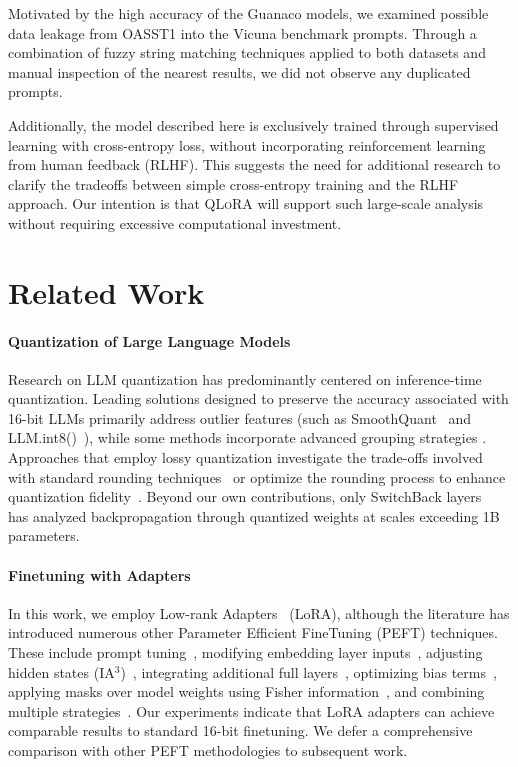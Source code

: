 Motivated by the high accuracy of the {Guanaco} models, we examined possible data leakage from OASST1 into the Vicuna benchmark prompts. Through a combination of fuzzy string matching techniques applied to both datasets and manual inspection of the nearest results, we did not observe any duplicated prompts.

Additionally, the model described here is exclusively trained through supervised learning with cross-entropy loss, without incorporating reinforcement learning from human feedback (RLHF). This suggests the need for additional research to clarify the tradeoffs between simple cross-entropy training and the RLHF approach. Our intention is that \textsc{QLoRA} will support such large-scale analysis without requiring excessive computational investment.

\section{Related Work}

\paragraph{Quantization of Large Language Models} Research on LLM quantization has predominantly centered on inference-time quantization. Leading solutions designed to preserve the accuracy associated with 16-bit LLMs primarily address outlier features (such as SmoothQuant~\citep{xiao2022smoothquant} and LLM.int8()~\citep{dettmers2022llm}), while some methods incorporate advanced grouping strategies \citep{park2022nuqmm, yao2022zeroquant}. Approaches that employ lossy quantization investigate the trade-offs involved with standard rounding techniques~\citep{dettmers2022case,zeng2022glm,pope2022efficiently} or optimize the rounding process to enhance quantization fidelity~\citep{frantar2022gptq}. Beyond our own contributions, only SwitchBack layers~\citep{wortsman2023stable} has analyzed backpropagation through quantized weights at scales exceeding 1B parameters.

\paragraph{Finetuning with Adapters} In this work, we employ Low-rank Adapters~\citep{hu2021lora} (LoRA), although the literature has introduced numerous other Parameter Efficient FineTuning (PEFT) techniques. These include prompt tuning~\citep{qin2021learning,lester2021power,li2021prefix}, modifying embedding layer inputs~\citep{an2022input}, adjusting hidden states (IA$^3$)~\citep{liu2022few}, integrating additional full layers~\citep{houlsby2019parameter}, optimizing bias terms~\citep{zaken2021bitfit}, applying masks over model weights using Fisher information~\citep{sung2021training}, and combining multiple strategies~\citep{henderson2021compacter}. Our experiments indicate that LoRA adapters can achieve comparable results to standard 16-bit finetuning. We defer a comprehensive comparison with other PEFT methodologies to subsequent work.

